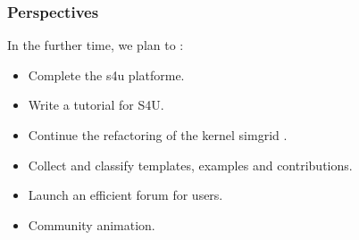 \begin{frame}\frametitle{Perspectives}
In the further time, we plan to : 
\begin{itemize}
\item Complete the s4u platforme.
\item Write a tutorial for S4U.
\item Continue the refactoring of the kernel simgrid .
\item Collect and classify templates, examples and contributions.
\item Launch an efficient forum for users.
\item Community animation.
\end{itemize}
\end{frame}